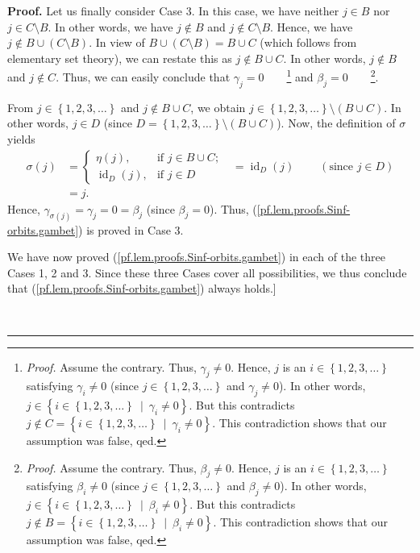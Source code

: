 \documentclass[numbers=enddot,12pt,final,onecolumn,notitlepage]{scrartcl}%
\theoremstyle{definition}
\newenvironment{proof}[1][Proof]{\noindent\textbf{#1.} }{\ \rule{0.5em}{0.5em}}
\newenvironment{verlong}{}{}
\begin{document}
\begin{verlong}
\begin{proof}
Let us finally consider Case 3. In this case, we have neither $j\in B$ nor
$j\in C\setminus B$. In other words, we have $j\notin B$ and $j\notin
C\setminus B$. Hence, we have $j\notin B\cup\left(  C\setminus B\right)  $. In
view of $B\cup\left(  C\setminus B\right)  =B\cup C$ (which follows from
elementary set theory), we can restate this as $j\notin B\cup C$. In other
words, $j\notin B$ and $j\notin C$. Thus, we can easily conclude that
$\gamma_{j}=0$\ \ \ \ \footnote{\textit{Proof.} Assume the contrary. Thus,
$\gamma_{j}\neq0$. Hence, $j$ is an $i\in\left\{  1,2,3,\ldots\right\}  $
satisfying $\gamma_{i}\neq0$ (since $j\in\left\{  1,2,3,\ldots\right\}  $ and
$\gamma_{j}\neq0$). In other words, $j\in\left\{  i\in\left\{  1,2,3,\ldots
\right\}  \ \mid\ \gamma_{i}\neq0\right\}  $. But this contradicts $j\notin
C=\left\{  i\in\left\{  1,2,3,\ldots\right\}  \ \mid\ \gamma_{i}\neq0\right\}
$. This contradiction shows that our assumption was false, qed.} and
$\beta_{j}=0$\ \ \ \ \footnote{\textit{Proof.} Assume the contrary. Thus,
$\beta_{j}\neq0$. Hence, $j$ is an $i\in\left\{  1,2,3,\ldots\right\}  $
satisfying $\beta_{i}\neq0$ (since $j\in\left\{  1,2,3,\ldots\right\}  $ and
$\beta_{j}\neq0$). In other words, $j\in\left\{  i\in\left\{  1,2,3,\ldots
\right\}  \ \mid\ \beta_{i}\neq0\right\}  $. But this contradicts $j\notin
B=\left\{  i\in\left\{  1,2,3,\ldots\right\}  \ \mid\ \beta_{i}\neq0\right\}
$. This contradiction shows that our assumption was false, qed.}.

From $j\in\left\{  1,2,3,\ldots\right\}  $ and $j\notin B\cup C$, we obtain
$j\in\left\{  1,2,3,\ldots\right\}  \setminus\left(  B\cup C\right)  $. In
other words, $j\in D$ (since $D=\left\{  1,2,3,\ldots\right\}  \setminus
\left(  B\cup C\right)  $). Now, the definition of $\sigma$ yields
\begin{align*}
\sigma\left(  j\right)   &  =%
\begin{cases}
\eta\left(  j\right)  , & \text{if }j\in B\cup C;\\
\operatorname*{id}\nolimits_{D}\left(  j\right)  , & \text{if }j\in D
\end{cases}
\ \ \ =\operatorname*{id}\nolimits_{D}\left(  j\right)
\ \ \ \ \ \ \ \ \ \ \left(  \text{since }j\in D\right) \\
&  =j.
\end{align*}
Hence, $\gamma_{\sigma\left(  j\right)  }=\gamma_{j}=0=\beta_{j}$ (since
$\beta_{j}=0$). Thus, (\ref{pf.lem.proofs.Sinf-orbits.gambet}) is proved in
Case 3.

We have now proved (\ref{pf.lem.proofs.Sinf-orbits.gambet}) in each of the
three Cases 1, 2 and 3. Since these three Cases cover all possibilities, we
thus conclude that (\ref{pf.lem.proofs.Sinf-orbits.gambet}) always holds.]


\end{proof}
\end{verlong}
\end{document}
